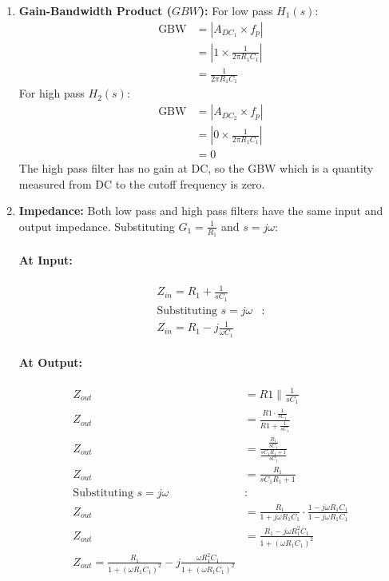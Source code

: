 \begin{enumerate}
\begin{align*}
        A_{DC_2} = 0 = -\infty dB
      \end{align*}
    Zero DC gain for \(H_2(s)\).
  \item \textbf{Gain-Bandwidth Product (\(GBW\)):}
    For low pass \(H_1(s)\):
    \begin{align*}
      \text{GBW} &= |A_{DC_1} \times f_p| \\
                 &= |1 \times \frac{1}{2\pi R_1C_1}| \\
                 &= \frac{1}{2\pi R_1C_1}
    \end{align*}
    For high pass \(H_2(s)\):
    \begin{align*}
      \text{GBW} &= |A_{DC_2} \times f_p| \\
                 &= |0 \times \frac{1}{2\pi R_1C_1}| \\
                 &= 0
    \end{align*}
    The high pass filter has no gain at DC, so the GBW which
    is a quantity measured from DC to the cutoff frequency is
    zero.
  \item \textbf{Impedance:}
    Both low pass and high pass filters have the same input
    and output impedance.
    Substituting \(G_1 = \frac{1}{R_1}\) and \(s = j \omega\):
    \paragraph{At Input:}
      \begin{align*}
        Z_{in} = R_1 + \frac{1}{sC_1} \\
        \text{Substituting } s = j \omega &: \\
        Z_{in} = R_1 - j \frac{1}{\omega C_1}
      \end{align*}
    \paragraph{At Output:}
      \begin{align*}
        Z_{out} &= R1 \parallel \frac{1}{sC_1} \\
        Z_{out} &= \frac{R1 \cdot \frac{1}{sC_1}}{R1 + \frac{1}{sC_1}} \\
        Z_{out} &= \frac{\frac{R_1}{sC_1}}{\frac{sC_1 R_1 + 1}{sC_1}} \\
        Z_{out} &= \frac{R_1}{sC_1 R_1 + 1} \\
        \text{Substituting } s = j \omega &: \\
        Z_{out} &= \frac{R_1}{1 + j \omega R_1 C_1} \cdot \frac{1 - j \omega R_1 C_1}{1 - j \omega R_1 C_1} \\
        Z_{out} &= \frac{R_1 - j \omega R_1^2 C_1}{1 + (\omega R_1 C_1)^2} \\
        Z_{out} = \frac{R_1}{1 + (\omega R_1 C_1)^2} - j \frac{\omega R_1^2 C_1}{1 + (\omega R_1 C_1)^2}
      \end{align*}
\end{enumerate}

